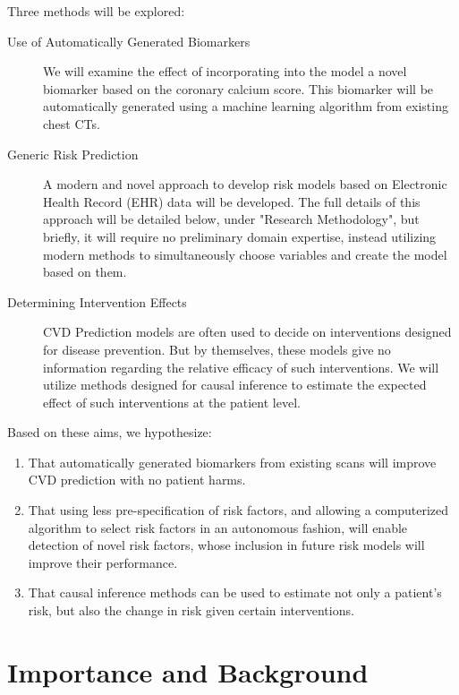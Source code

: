 \documentclass[a4paper,12pt]{article}
\begin{document}
	Three methods will be explored:
	\begin{description}
		
		\item[Use of Automatically Generated Biomarkers] We will examine the effect of incorporating into the model a novel biomarker based on the coronary calcium score. This biomarker will be automatically generated using a machine learning algorithm from existing chest CTs.
		
		\item[Generic Risk Prediction] A modern and novel approach to develop risk models based on Electronic Health Record (EHR) data will be developed. The full details of this approach will be detailed below, under "Research Methodology", but briefly, it will require no preliminary domain expertise, instead utilizing modern methods to simultaneously choose variables and create the model based on them.
		
		\item[Determining Intervention Effects] CVD Prediction models are often used to decide on interventions designed for disease prevention. But by themselves, these models give no information regarding the relative efficacy of such interventions. We will utilize methods designed for causal inference to estimate the expected effect of such interventions at the patient level.
		
	\end{description}
	
		Based on these aims, we hypothesize:
		\begin{enumerate}
			
			\item That automatically generated biomarkers from existing scans will improve CVD prediction with no patient harms.
			
			\item That using less pre-specification of risk factors, and allowing a computerized algorithm to select risk factors in an autonomous fashion, will enable detection of novel risk factors, whose inclusion in future risk models will improve their performance.
			
			\item That causal inference methods can be used to estimate not only a patient's risk, but also the change in risk given certain interventions.
			
		\end{enumerate}
		
	\section{Importance and Background}
	
\end{document}
